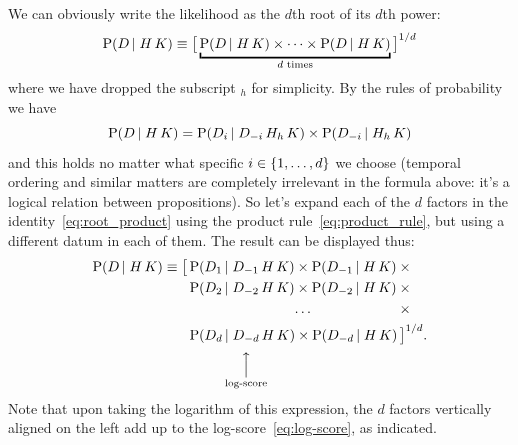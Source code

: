 \documentclass[\ifafour a4paper,12pt,\else a5paper,10pt,\fi%
onecolumn,oneside,article,%
british%
]{memoir}
\theoremstyle{remark}
\theoremstyle{innote}
\DeclarePairedDelimiter\set{\{}{\}}
\newcommand*{\p}{\mathrm{P}}%
\renewcommand*{\|}[1][]{\nonscript\,#1\vert\nonscript\;\mathopen{}}
\newcommand*{\yK}{K}
\begin{document}
We can obviously write the likelihood as the $d$th root of its $d$th power:
\begin{equation}
  \label{eq:root_product}
  \p(D \| H \, \yK) \equiv  \bigl[\,
  \underbracket{\p(D \| H \, \yK) \times \dotsm \times
  \p(D \| H \, \yK)}_{\text{$d$ times}}
  \,\bigr]^{1/d}
\end{equation}
where we have dropped the subscript ${}_{h}$ for simplicity. By the rules
of probability we have
\begin{equation}
  \label{eq:product_rule}
  \p(D \| H \, \yK) =
  \p(D_{i} \| D_{-i} \, H_{h} \, \yK) \times \p(D_{-i} \|  H_{h} \, \yK)
\end{equation}
and this holds no matter what specific $i \in \set{1, \dotsc,
  d}$ we choose (temporal ordering and similar matters are completely
irrelevant in the formula above: it's a logical relation between
propositions). So let's expand each of the $d$ factors in the
identity~\eqref{eq:root_product} using the product
rule~\eqref{eq:product_rule}, but using a different datum in each of them.
The result can be displayed thus:
\begin{equation}
  \label{eq:product_2}
  \begin{aligned}
    \p(D \| H \, \yK) \equiv{}
    \bigl[\,&\p(D_{1} \| D_{-1} \, H \, \yK) \times
            \p(D_{-1} \|  H \, \yK) \times{}\\
          &\p(D_{2} \| D_{-2} \, H \, \yK) \times
            \p(D_{-2} \| H \, \yK)\times{}\\
          &\hphantom{\p(D_{2} \| D_{-2} \, H \, \yK)}
            \mathrlap{\dotso}\hphantom{{}\times  \p(D_{-2} \| H \, \yK)}\times{}\\
          &\p(D_{d} \|\underbracket[0pt][1ex]{ D_{-d} }_{\mathclap{
            \begin{smallmatrix}
              \Big\uparrow\\\text{log-score}
            \end{smallmatrix}
}} H \, \yK) \times\p(D_{-d} \|  H \, \yK)
            \,\bigr]^{1/d}.
  \end{aligned}
\end{equation}
Note that upon taking the logarithm of this expression, the $d$ factors
vertically aligned on the left add up to the
log-score~\eqref{eq:log-score}, as indicated.
\end{document}

